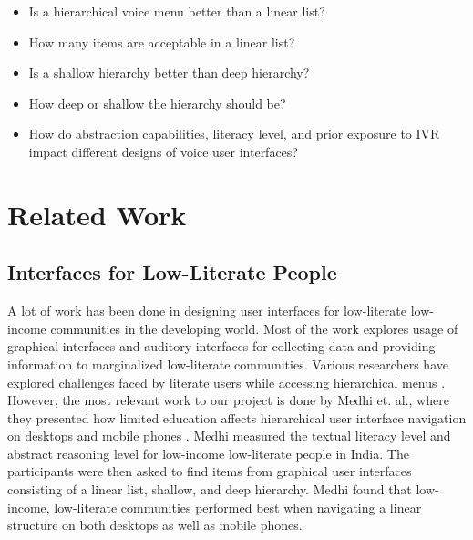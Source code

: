 \documentclass{sigchi}
\begin{document}
\begin{itemize}
\item Is a hierarchical voice menu better than a linear list?
\item How many items are acceptable in a linear list?
\item Is a shallow hierarchy better than deep hierarchy?
\item How deep or shallow the hierarchy should be?
\item How do abstraction capabilities, literacy level, and prior exposure to IVR impact different designs of voice user interfaces? 
\end{itemize}


\section{Related Work}

\subsection{Interfaces for Low-Literate People}
A lot of work has been done in designing user interfaces for low-literate low-income communities in the developing world. Most of the work explores usage of graphical interfaces \cite{Grisedale1997,Medhi2011a,Medhi2008,Ghosh2003} and auditory interfaces \cite{Cuendet2013,Agarwal2010,Mudliar2013} for collecting data and providing information to marginalized low-literate communities. Various researchers have explored challenges faced by literate users while accessing hierarchical menus \cite{Allen1983,Chaudry2012}. However, the most relevant work to our project is done by Medhi et. al., where they presented how limited education affects hierarchical user interface navigation on desktops and mobile phones \cite{Medhi2013a,Medhi2013b}. Medhi measured the textual literacy level and abstract reasoning level for low-income low-literate people in India. The participants were then asked to find items from graphical user interfaces consisting of a linear list, shallow, and deep hierarchy. Medhi found that low-income, low-literate communities performed best when navigating a linear structure on both desktops as well as mobile phones.
\end{document}
